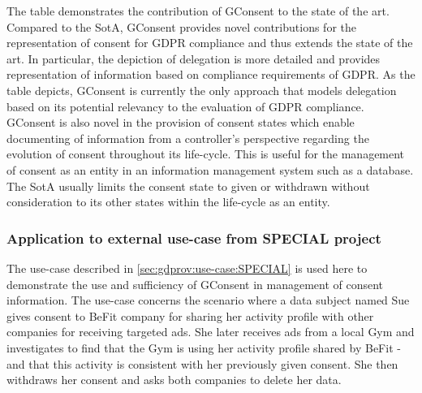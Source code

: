 The table demonstrates the contribution of GConsent to the state of the art. 
Compared to the SotA, GConsent provides novel contributions for the representation of consent for GDPR compliance and thus extends the state of the art.
In particular, the depiction of delegation is more detailed and provides representation of information based on compliance requirements of GDPR.
As the table depicts, GConsent is currently the only approach that models delegation based on its potential relevancy to the evaluation of GDPR compliance.
GConsent is also novel in the provision of consent states which enable documenting of information from a controller's perspective regarding the evolution of consent throughout its life-cycle. This is useful for the management of consent as an entity in an information management system such as a database.
The SotA usually limits the consent state to given or withdrawn without consideration to its other states within the life-cycle as an entity.

\subsubsection{Application to external use-case from SPECIAL project}\label{sec:gconsent:use-case:SPECIAL}
The use-case described in \autoref{sec:gdprov:use-case:SPECIAL} is used here to demonstrate the use and sufficiency of GConsent in management of consent information. The use-case concerns the scenario where a data subject named Sue gives consent to BeFit company for sharing her activity profile with other companies for receiving targeted ads. She later receives ads from a local Gym and investigates to find that the Gym is using her activity profile shared by BeFit - and that this activity is consistent with her previously given consent. She then withdraws her consent and asks both companies to delete her data.

